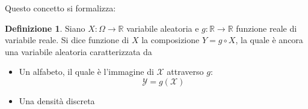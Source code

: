 \documentclass{article}
\theoremstyle{plain}
\theoremstyle{definition}
\newtheorem{definizione}{Definizione}[section]
\theoremstyle{remark}
\begin{document}
Questo concetto si formalizza:
\begin{definizione}
	Siano $X:\Omega\to\mathds{R}$ variabile aleatoria e $g:\mathds{R}\to\mathds{R}$ funzione reale di variabile reale. Si dice funzione di $X$ la composizione $Y=g\circ X$, la quale è ancora una variabile aleatoria caratterizzata da
	\begin{itemize}
		\item Un alfabeto, il quale è l'immagine di $\mathcal{X}$ attraverso $g$:
		\begin{equation*}
			\mathcal{Y}=g(\mathcal{X})
		\end{equation*}
		\item Una densità discreta %
	\end{itemize}
\end{definizione}
\end{document}
